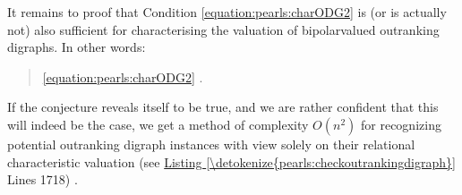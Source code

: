 \documentclass[a4paper,12pt,english]{sphinxhowto}
\begin{document}
\sphinxAtStartPar
It remains to proof that Condition \eqref{equation:pearls:charODG2} is (or is actually not) also sufficient for characterising the valuation of bipolar\sphinxhyphen{}valued outranking digraphs. In other words:

\sphinxAtStartPar
{}
\begin{quote}

\sphinxAtStartPar
{} \eqref{equation:pearls:charODG2} .
\end{quote}

\sphinxAtStartPar
If the conjecture reveals itself to be true, and we are rather confident that this will indeed be the case, we get a method of complexity \(O(n^2)\) for recognizing potential outranking digraph instances with view solely on their relational characteristic valuation (see \hyperref[\detokenize{pearls:checkoutrankingdigraph}]{Listing \ref{\detokenize{pearls:checkoutrankingdigraph}}} Lines 17\sphinxhyphen{}18) .
\def\sphinxLiteralBlockLabel{\label{\detokenize{pearls:checkoutrankingdigraph}}}
%
\end{document}
